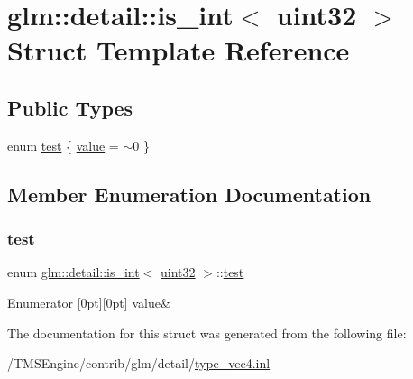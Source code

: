 \hypertarget{structglm_1_1detail_1_1is__int_3_01uint32_01_4}{}\section{glm\+:\+:detail\+:\+:is\+\_\+int$<$ uint32 $>$ Struct Template Reference}
\label{structglm_1_1detail_1_1is__int_3_01uint32_01_4}
\subsection*{Public Types}
\begin{DoxyCompactItemize}
\item 
enum \hyperlink{structglm_1_1detail_1_1is__int_3_01uint32_01_4_a8930e3fe143b2eb718be340178475095}{test} \{ \hyperlink{structglm_1_1detail_1_1is__int_3_01uint32_01_4_a8930e3fe143b2eb718be340178475095a33d5c966994a88b96988fb1085e9530c}{value} = $\sim$0
 \}
\end{DoxyCompactItemize}


\subsection{Member Enumeration Documentation}
\mbox{\label{structglm_1_1detail_1_1is__int_3_01uint32_01_4_a8930e3fe143b2eb718be340178475095}} 
\subsubsection{\texorpdfstring{test}{test}}
{\footnotesize\ttfamily enum \hyperlink{structglm_1_1detail_1_1is__int}{glm\+::detail\+::is\+\_\+int}$<$ \hyperlink{namespaceglm_1_1detail_ade6cfbf377022aaa391af8cd50489222}{uint32} $>$\+::\hyperlink{structglm_1_1detail_1_1is__int_3_01uint32_01_4_a8930e3fe143b2eb718be340178475095}{test}}

\begin{DoxyEnumFields}{Enumerator}
[0pt][0pt]{}\mbox{\label{structglm_1_1detail_1_1is__int_3_01uint32_01_4_a8930e3fe143b2eb718be340178475095a33d5c966994a88b96988fb1085e9530c}} 
value&\\
\hline

\end{DoxyEnumFields}


The documentation for this struct was generated from the following file\+:\begin{DoxyCompactItemize}
\item 
/\+T\+M\+S\+Engine/contrib/glm/detail/\hyperlink{type__vec4_8inl}{type\+\_\+vec4.\+inl}\end{DoxyCompactItemize}
